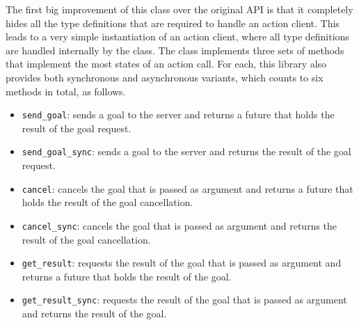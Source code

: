The first big improvement of this class over the original API is that it completely hides all the type definitions that are required to handle an action client. This leads to a very simple instantiation of an action client, where all type definitions are handled internally by the class. The class implements three sets of methods that implement the most states of an action call. For each, this library also provides both synchronous and asynchronous variants, which counts to six methods in total, as follows.
\begin{itemize}
  \item \texttt{send\_goal}: sends a goal to the server and returns a future that holds the result of the goal request.
  \item \texttt{send\_goal\_sync}: sends a goal to the server and returns the result of the goal request.
  \item \texttt{cancel}: cancels the goal that is passed as argument and returns a future that holds the result of the goal cancellation.
  \item \texttt{cancel\_sync}: cancels the goal that is passed as argument and returns the result of the goal cancellation.
  \item \texttt{get\_result}: requests the result of the goal that is passed as argument and returns a future that holds the result of the goal.
  \item \texttt{get\_result\_sync}: requests the result of the goal that is passed as argument and returns the result of the goal.
\end{itemize}

